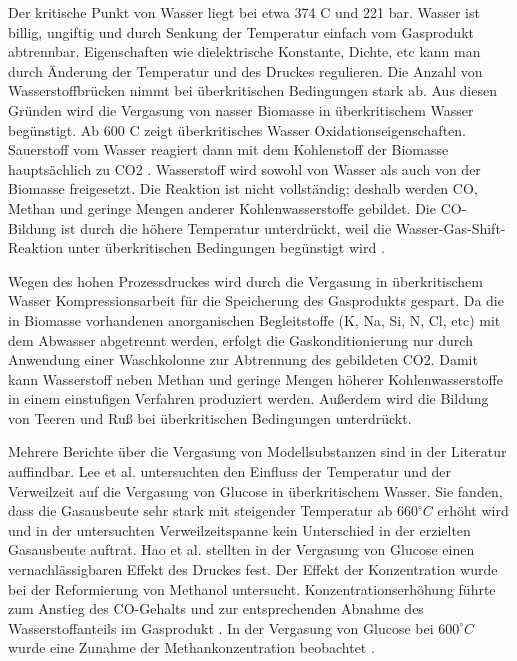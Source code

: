 Der kritische Punkt von Wasser liegt bei etwa  374 C und  221 bar. Wasser ist billig, ungiftig und durch Senkung der Temperatur einfach vom Gasprodukt abtrennbar. Eigenschaften wie dielektrische Konstante, Dichte, etc kann man durch Änderung der Temperatur und des Druckes regulieren. Die Anzahl von Wasserstoffbrücken nimmt bei überkritischen Bedingungen stark ab. Aus diesen Gründen wird die Vergasung von nasser Biomasse in überkritischem Wasser begünstigt.
Ab 600 C zeigt überkritisches Wasser Oxidationseigenschaften. Sauerstoff vom Wasser reagiert dann mit dem Kohlenstoff der Biomasse hauptsächlich zu CO2 \cite{Feng03}.
Wasserstoff wird sowohl von Wasser als auch von der Biomasse freigesetzt. Die Reaktion ist nicht vollständig; deshalb werden CO, Methan und geringe Mengen anderer Kohlenwasserstoffe gebildet. Die CO-Bildung ist durch die höhere Temperatur unterdrückt, weil die Wasser-Gas-Shift-Reaktion unter überkritischen Bedingungen begünstigt wird \cite{Sato04}.

Wegen des hohen Prozessdruckes wird durch die Vergasung in überkritischem Wasser Kompressionsarbeit für die Speicherung des Gasprodukts gespart. Da die in Biomasse vorhandenen anorganischen Begleitstoffe (K, Na, Si, N, Cl, etc) mit dem Abwasser abgetrennt werden, erfolgt die Gaskonditionierung nur durch Anwendung einer Waschkolonne zur Abtrennung des gebildeten CO2. Damit kann Wasserstoff neben Methan und geringe Mengen höherer Kohlenwasserstoffe in einem einstufigen Verfahren produziert werden. Außerdem wird die Bildung von Teeren und Ruß bei überkritischen Bedingungen unterdrückt. 

Mehrere Berichte über die Vergasung von Modellsubstanzen sind in der Literatur auffindbar. Lee et al. \cite{Lee02} untersuchten den Einfluss der Temperatur und der Verweilzeit auf die Vergasung von Glucose in überkritischem Wasser. Sie fanden, dass die Gasausbeute sehr stark mit steigender Temperatur ab $660 ^{\circ}C$ erhöht wird und in der untersuchten Verweilzeitspanne kein Unterschied in der erzielten Gasausbeute auftrat. Hao et al. \cite{Hao03}  stellten in der Vergasung von Glucose einen vernachlässigbaren Effekt des Druckes fest. Der Effekt der Konzentration wurde bei der Reformierung von Methanol untersucht. Konzentrationserhöhung führte zum Anstieg des CO-Gehalts und zur entsprechenden Abnahme des Wasserstoffanteils im Gasprodukt \cite{tay03}. In der Vergasung von Glucose bei $600 ^{\circ}C$ wurde eine Zunahme der Methankonzentration beobachtet \cite{aih93}.

